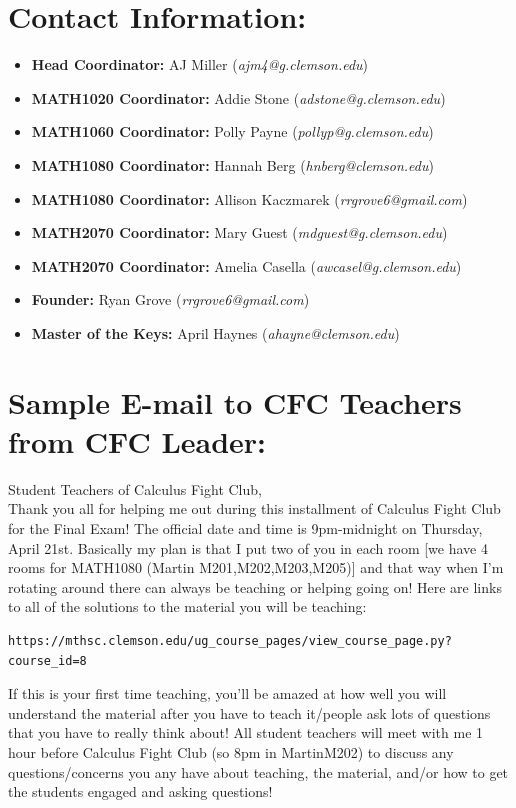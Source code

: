 \documentclass[paper=a4, fontsize=11pt]{scrartcl} %
\numberwithin{equation}{section} %
\numberwithin{figure}{section} %
\numberwithin{table}{section} %
\begin{document}
\section*{\textbf{Contact Information:}}
\begin{itemize}
\item \textbf{Head Coordinator:} AJ Miller (\textit{ajm4@g.clemson.edu})
\item \textbf{MATH1020 Coordinator:} Addie Stone (\textit{adstone@g.clemson.edu})
\item \textbf{MATH1060 Coordinator:} Polly Payne (\textit{pollyp@g.clemson.edu})
\item \textbf{MATH1080 Coordinator:} Hannah Berg (\textit{hnberg@clemson.edu})
\item \textbf{MATH1080 Coordinator:} Allison Kaczmarek (\textit{rrgrove6@gmail.com})
\item \textbf{MATH2070 Coordinator:} Mary Guest (\textit{mdguest@g.clemson.edu})
\item \textbf{MATH2070 Coordinator:} Amelia Casella (\textit{awcasel@g.clemson.edu})
\item \textbf{Founder:} Ryan Grove (\textit{rrgrove6@gmail.com})
\item \textbf{Master of the Keys:} April Haynes (\textit{ahayne@clemson.edu})
\end{itemize}

\section*{\textbf{Sample E-mail to CFC Teachers from CFC Leader:}}
Student Teachers of Calculus Fight Club, \\

Thank you all for helping me out during this installment of Calculus Fight Club for the Final Exam!  The official date and time is 9pm-midnight on Thursday, April 21st. Basically my plan is that I put two of you in each room [we have 4 rooms for MATH1080 (Martin M201,M202,M203,M205)] and that way when I'm rotating around there can always be teaching or helping going on!  Here are links to all of the solutions to the material you will be teaching: 
\begin{lstlisting}
https://mthsc.clemson.edu/ug_course_pages/view_course_page.py?course_id=8
\end{lstlisting}

If this is your first time teaching, you'll be amazed at how well you will understand the material after you have to teach it/people ask lots of questions that you have to really think about!  All student teachers will meet with me 1 hour before Calculus Fight Club (so 8pm in MartinM202) to discuss any questions/concerns you any have about teaching, the material, and/or how to get the students engaged and asking questions! \\
\end{document}
